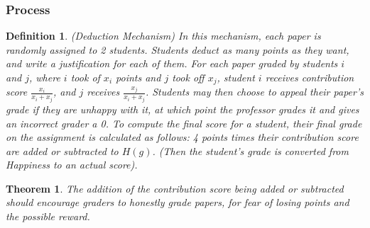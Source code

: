 \documentclass[12pt, Arial]{article}
\newtheorem{theorem}{Theorem}
\newtheorem{definition}{Definition}
\begin{document}
\subsubsection{Process}
\begin{definition}(Deduction Mechanism)
In this mechanism, each paper is randomly assigned to 2 students. Students deduct as many points as they want, and write a justification for each of them. For each paper graded by students $i$ and $j$, where $i$ took of $x_i$ points and $j$ took off $x_j$, student $i$ receives contribution score $\frac{x_i}{x_i + x_j}$, and $j$ receives $\frac{x_j}{x_i + x_j}$. Students may then choose to appeal their paper's grade if they are unhappy with it, at which point the professor grades it and gives an incorrect grader a 0. To compute the final score for a student, their final grade on the assignment is calculated as follows: 4 points times their contribution score are added or subtracted to $H(g)$. (Then the student’s grade is converted from Happiness to an actual score).
\end{definition}
\begin{theorem}
The addition of the contribution score being added or subtracted should encourage graders to honestly grade papers, for fear of losing points and the possible reward.
\end{theorem}
\end{document}
